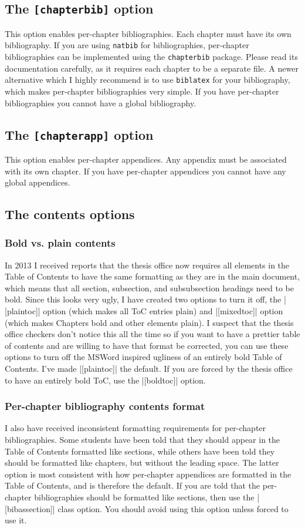 \documentclass[11pt]{article}
\newcommand*{\pkg}[1]{\texttt{#1}\xspace}
\begin{document}
\subsection{The \pkg{[chapterbib]} option}
This option enables per-chapter bibliographies. Each chapter must have its own bibliography. If you are using \pkg{natbib} for bibliographies, per-chapter bibliographies can be implemented using the \pkg{chapterbib} package. Please read its documentation carefully, as it requires each chapter to be a separate file. A newer alternative which I highly recommend is to use \pkg{biblatex} for your bibliography, which makes per-chapter bibliographies very simple. If you have per-chapter bibliographies you cannot have a global bibliography.
\subsection{The \pkg{[chapterapp]} option}
This option enables per-chapter appendices. Any appendix must be associated with its own chapter. If you have per-chapter appendices you cannot have any global appendices. 
\subsection{The contents options}
\subsubsection{Bold vs. plain contents}
In 2013 I received reports that the thesis office now requires all elements in the Table of Contents to have the same formatting as they are in the main document, which means that all section, subsection, and subsubsection headings need to be bold.  Since this looks very ugly, I have created two options to turn it off, the |[plaintoc]| option (which makes all ToC entries plain) and |[mixedtoc]| option (which makes Chapters bold and other elements plain). I suspect that the thesis office checkers don't notice this all the time so if you want to have a prettier table of contents and are willing to have that format be corrected, you can use these options to turn off the MSWord inspired ugliness of an entirely bold Table of Contents. I've made |[plaintoc]| the default.  If you are forced by the thesis office to have an entirely bold ToC, use the |[boldtoc]| option.

\subsubsection{Per-chapter bibliography contents format}
I also have received inconsistent formatting requirements for per-chapter bibliographies. Some students have been told that they should appear in the Table of Contents formatted like sections, while others have been told they should be formatted like chapters, but without the leading space. The latter option is most consistent with how per-chapter appendices are formatted in the Table of Contents, and is therefore the default. If you are told that the per-chapter bibliographies should be formatted like sections, then use the |[bibassection]| class option. You should avoid using this option unless forced to use it.  
\end{document}
